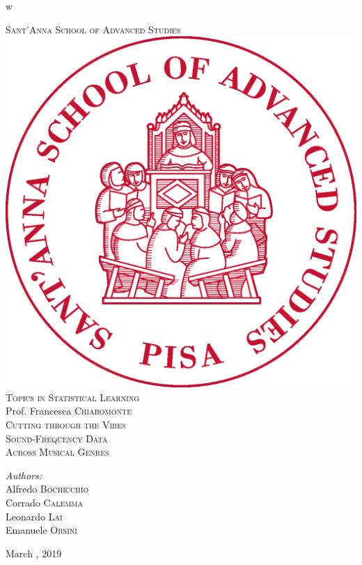 w\documentclass[11pt, oneside]{article}
\begin{document}
\begin{titlepage}


\center

\textsc{\Large Sant'Anna School of Advanced Studies}\\[1.5cm]
\includegraphics[scale=.3]{sssup.eps}\\[1.5cm]
\textsc{\LARGE Topics in Statistical Learning}\\[0.7cm]
\Large{Prof. Francesca \textsc{Chiaromonte}}\\[1.6cm]

{ \huge{\textsc{Cutting through the Vibes}}}\\[0.2cm]
{ \huge{\textsc{Sound-Frequency Data}}}\\[0.2cm]
{ \huge{\textsc{Across Musical Genres}}}\\[3.6cm]


\begin{flushleft} \Large
\emph{Authors:}\\
Alfredo \textsc{Bochicchio}\\
Corrado \textsc{Calemma}\\
Leonardo \textsc{Lai}\\
Emanuele \textsc{Orsini}\\
\end{flushleft}

\large{March , 2019}\\[2cm] 
\vfill 

\end{titlepage}
\newpage
{}
\end{document}
